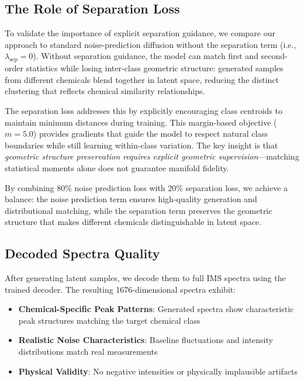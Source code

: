 \documentclass[sigconf]{acmart}
\begin{document}
\subsection{The Role of Separation Loss}

To validate the importance of explicit separation guidance, we compare our approach to standard noise-prediction diffusion without the separation term (i.e., $\lambda_{\text{sep}} = 0$).  Without separation guidance, the model can match first and second-order statistics while losing inter-class geometric structure: generated samples from different chemicals blend together in latent space, reducing the distinct clustering that reflects chemical similarity relationships.

The separation loss addresses this by explicitly encouraging class centroids to maintain minimum distances during training. This margin-based objective ($m=5.0$) provides gradients that guide the model to respect natural class boundaries while still learning within-class variation. The key insight is that \textit{geometric structure preservation requires explicit geometric supervision}—matching statistical moments alone does not guarantee manifold fidelity.

By combining 80\% noise prediction loss with 20\% separation loss, we achieve a balance: the noise prediction term ensures high-quality generation and distributional matching, while the separation term preserves the geometric structure that makes different chemicals distinguishable in latent space.

\subsection{Decoded Spectra Quality}

After generating latent samples, we decode them to full IMS spectra using the trained decoder. The resulting 1676-dimensional spectra exhibit:

\begin{itemize}
    \item \textbf{Chemical-Specific Peak Patterns}: Generated spectra show characteristic peak structures matching the target chemical class
    \item \textbf{Realistic Noise Characteristics}: Baseline fluctuations and intensity distributions match real measurements
    \item \textbf{Physical Validity}: No negative intensities or physically implausible artifacts
\end{itemize}
\end{document}

